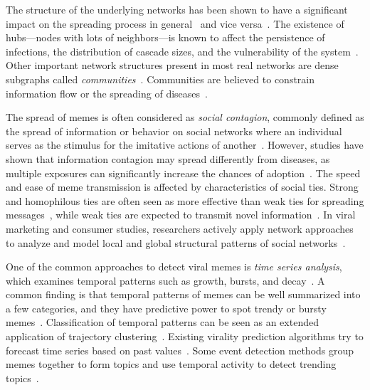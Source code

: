 \documentclass[letterpaper]{article}
\begin{document}
The structure of the underlying networks has been shown to have a significant impact on the spreading process in general~\cite{daley_epidemics_1964,goffman1964nature,vesp2008book,vespignani2001SISonSF} and vice versa~\cite{weng2013shortcut}. The existence of hubs---nodes with lots of neighbors---is known to affect the persistence of infections, the distribution of cascade sizes, and the vulnerability of the system~\cite{vespignani2001SISonSF,Watts2002}. Other important network structures present in most real networks are dense subgraphs called \emph{communities}~\cite{newman2006modularity,Rosvall2008InfoMap,Ahn2010LinkCommunity,fortunato2010community}. Communities are believed to constrain information flow or the spreading of diseases~\cite{weak_ties_1973,JP2007pnas,Rosvall2008InfoMap,colbaugh2012early,weng2013viral}.



The spread of memes is often considered as \emph{social contagion}, commonly defined as the spread of information or behavior on social networks where an individual serves as the stimulus for the imitative actions of another~\cite{contagion1985,goffman1964nature,daley_epidemics_1964}. However, studies have shown that information contagion may spread differently from diseases, as multiple exposures can significantly increase the chances of adoption~\cite{threshold_model,Centola2010SpreadExp,romero_differences_2011}.
The speed and ease of meme transmission is affected by characteristics of social ties.  Strong and homophilous ties are often seen as more effective than weak ties for spreading messages~\cite{Brown:1987kx}, while weak ties are expected to transmit novel information~\cite{weak_ties_1973}.  In viral marketing and consumer studies, researchers actively apply network approaches to analyze and model local and global structural patterns of social networks~\cite{Leskovec2007viral,Mason2008propagation,aral2011viral}.


One of the common approaches to detect viral memes is \emph{time series analysis}, which examines temporal patterns such as growth, bursts, and decay~\cite{wu_novelty_2007,romero_differences_2011,asur_trends_2011}. A common finding is that temporal patterns of memes can be well summarized into a few categories, and they have predictive power to spot trendy or bursty memes~\cite{Yang2011temporal,Cattuto2012WWW}. Classification of temporal patterns can be seen as an extended application of trajectory clustering~\cite{Gaffney1999KDD,Lee2007TrajClus}.  Existing virality prediction algorithms try to forecast time series based on past values~\cite{MacNames1998,Lenser2005ICRA,Kaltenbrunner2007Slashdot}.
Some event detection methods group memes together to form topics and use temporal activity to detect trending topics~\cite{Becker2011icwsm,cataldi2010}.
\end{document}
